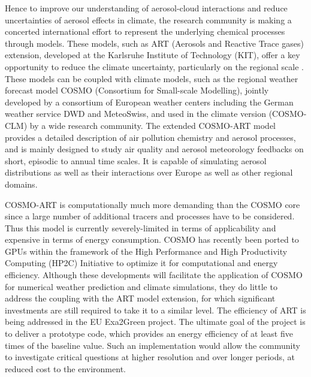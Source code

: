 Hence to  improve our understanding of  aerosol-cloud interactions and
reduce  uncertainties  of aerosol  effects  in  climate, the  research
community is making a  concerted international effort to represent the
underlying chemical  processes through models.  These  models, such as
ART (Aerosols  and Reactive Trace  gases) extension, developed  at the
Karlsruhe Institute  of Technology (KIT),  offer a key  opportunity to
reduce   the  climate  uncertainty,   particularly  on   the  regional
scale \citep{Knote-2011, Bangert-2011,  Knote-2013}.  These models can
be coupled with climate models,  such as the regional weather forecast
model COSMO (Consortium  for Small-scale Modelling), jointly developed
by  a consortium  of  European weather  centers  including the  German
weather service  DWD and MeteoSwiss,  and used in the  climate version
(COSMO-CLM)  by a  wide  research community.   The extended  COSMO-ART
model provides  a detailed description of air  pollution chemistry and
aerosol processes,  and is  mainly designed to  study air  quality and
aerosol  meteorology  feedbacks  on  short, episodic  to  annual  time
scales.  It is capable of  simulating aerosol distributions as well as
their interactions over Europe as well as other regional domains.

COSMO-ART is  computationally much more demanding than  the COSMO core
since a  large number of additional  tracers and processes  have to be
considered.  Thus this model is currently severely-limited in terms of
applicability and expensive in terms of energy consumption.  COSMO has
recently  been  ported  to  GPUs  within the  framework  of  the  High
Performance  and  High  Productivity  Computing (HP2C)  Initiative  to
optimize it  for computational and energy  efficiency.  Although these
developments will  facilitate the  application of COSMO  for numerical
weather prediction and climate  simulations, they do little to address
the  coupling with  the  ART model  extension,  for which  significant
investments  are still required  to take  it to  a similar  level. The
efficiency of ART is being  addressed in the EU Exa2Green project. The
ultimate goal  of the  project is to  deliver a prototype  code, which
provides an energy  efficiency of at least five  times of the baseline
value.   Such   an  implementation   would  allow  the   community  to
investigate critical  questions at  higher resolution and  over longer
periods, at reduced cost  to the environment.  


